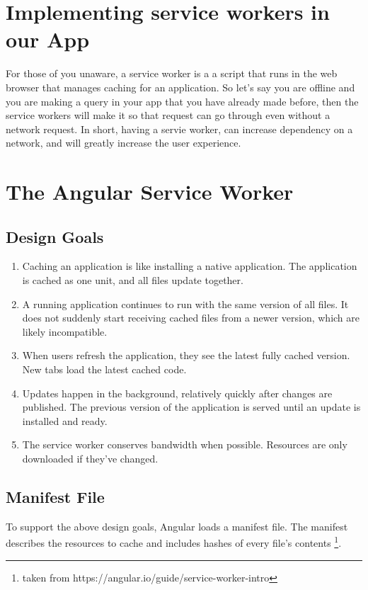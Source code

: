 \maketitle{}
\section{ Implementing service workers in our App }

For those of you unaware, a service worker is a a script that runs in the web
browser that manages caching for an application. So let's say you are offline
and you are making a query in your app that you have already made before, then
the service workers will make it so that request can go through even without a
network request. In short, having a servie worker, can increase dependency on a
network, and will greatly increase the user experience.

\section{ The Angular Service Worker }

\subsection{ Design Goals }
\begin{enumerate}
  \item Caching an application is like installing a native application.
  The application is cached as one unit, and all files update together.
  \item A running application continues to run with the same version of all
  files. It does not suddenly start receiving cached files from a newer version,
  which are likely incompatible.
  \item When users refresh the application, they see the latest fully cached
  version. New tabs load the latest cached code.
  \item Updates happen in the background, relatively quickly after changes are
  published. The previous version of the application is served until an update
  is installed and ready.
  \item The service worker conserves bandwidth when possible. Resources are only
  downloaded if they've changed.
\end{enumerate}

\subsection{ Manifest File }
To support the above design goals, Angular loads a manifest file. The manifest
describes the resources to cache and includes hashes of every file's contents
\footnote{taken from https://angular.io/guide/service-worker-intro}.

